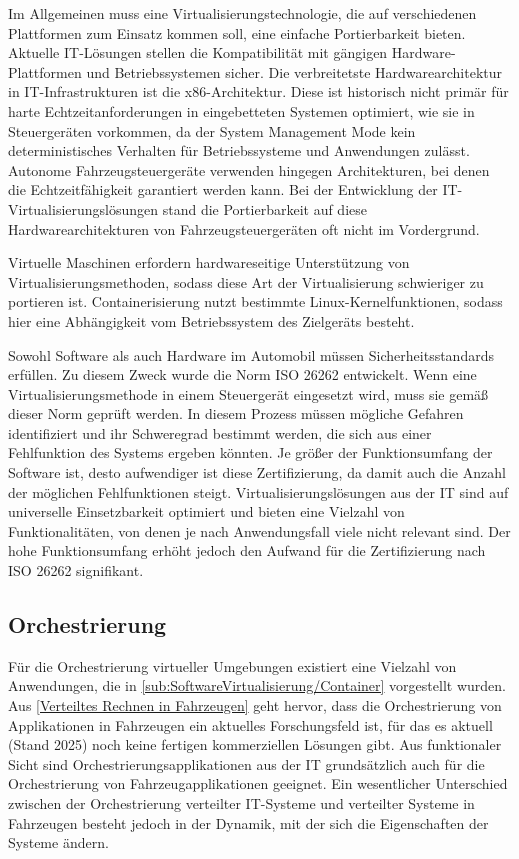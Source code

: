 Im Allgemeinen muss eine Virtualisierungstechnologie, die auf verschiedenen Plattformen zum Einsatz kommen soll, eine einfache Portierbarkeit bieten. Aktuelle IT-Lösungen stellen die Kompatibilität mit gängigen Hardware-Plattformen und Betriebssystemen sicher. Die verbreitetste Hardwarearchitektur in IT-Infrastrukturen ist die x86-Architektur. Diese ist historisch nicht primär für harte Echtzeitanforderungen in eingebetteten Systemen optimiert, wie sie in Steuergeräten vorkommen, da der System Management Mode kein deterministisches Verhalten für Betriebssysteme und Anwendungen zulässt. Autonome Fahrzeugsteuergeräte verwenden hingegen Architekturen, bei denen die Echtzeitfähigkeit garantiert werden kann. Bei der Entwicklung der IT-Virtualisierungslösungen stand die Portierbarkeit auf diese Hardwarearchitekturen von Fahrzeugsteuergeräten oft nicht im Vordergrund. 

Virtuelle Maschinen erfordern hardwareseitige Unterstützung von Virtualisierungsmethoden, sodass diese Art der Virtualisierung schwieriger zu portieren ist. Containerisierung nutzt bestimmte Linux-Kernelfunktionen, sodass hier eine Abhängigkeit vom Betriebssystem des Zielgeräts besteht.

Sowohl Software als auch Hardware im Automobil müssen Sicherheitsstandards erfüllen. Zu diesem Zweck wurde die Norm ISO 26262 entwickelt. \cite{Birch2013} Wenn eine Virtualisierungsmethode in einem Steuergerät eingesetzt wird, muss sie gemäß dieser Norm geprüft werden. In diesem Prozess müssen mögliche Gefahren identifiziert und ihr Schweregrad bestimmt werden, die sich aus einer Fehlfunktion des Systems ergeben könnten. Je größer der Funktionsumfang der Software ist, desto aufwendiger ist diese Zertifizierung, da damit auch die Anzahl der möglichen Fehlfunktionen steigt. Virtualisierungslösungen aus der IT sind auf universelle Einsetzbarkeit optimiert und bieten eine Vielzahl von Funktionalitäten, von denen je nach Anwendungsfall viele nicht relevant sind. Der hohe Funktionsumfang erhöht jedoch den Aufwand für die Zertifizierung nach ISO 26262 signifikant.

\subsection{Orchestrierung}
Für die Orchestrierung virtueller Umgebungen existiert eine Vielzahl von Anwendungen, die in \autoref{sub:SoftwareVirtualisierung/Container} vorgestellt wurden. Aus \autoref{Verteiltes Rechnen in Fahrzeugen} geht hervor, dass die Orchestrierung von Applikationen in Fahrzeugen ein aktuelles Forschungsfeld ist, für das es aktuell (Stand 2025) noch keine fertigen kommerziellen Lösungen gibt. Aus funktionaler Sicht sind Orchestrierungsapplikationen aus der IT grundsätzlich auch für die Orchestrierung von Fahrzeugapplikationen geeignet. Ein wesentlicher Unterschied zwischen der Orchestrierung verteilter IT-Systeme und verteilter Systeme in Fahrzeugen besteht jedoch in der Dynamik, mit der sich die Eigenschaften der Systeme ändern. 

